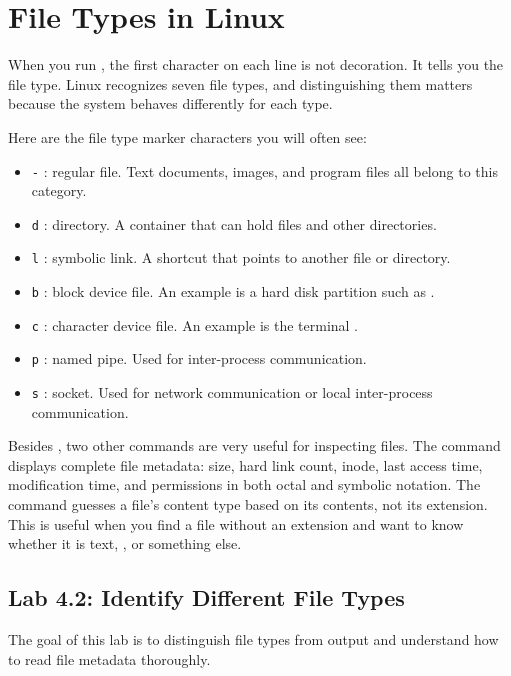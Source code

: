 \section{File Types in Linux}
\label{sec:filetypes}

When you run , the first character on each line is not decoration. It tells you the file type. Linux recognizes seven file types, and distinguishing them matters because the system behaves differently for each type.

Here are the file type marker characters you will often see:

\begin{itemize}
    \item \texttt{-} : regular file. Text documents, images, and program  files all belong to this category.
    \item \texttt{d} : directory. A container that can hold files and other directories.
    \item \texttt{l} : symbolic link. A shortcut that points to another file or directory.
    \item \texttt{b} : block device file. An example is a hard disk partition such as .
    \item \texttt{c} : character device file. An example is the terminal .
    \item \texttt{p} : named pipe. Used for inter-process communication.
    \item \texttt{s} : socket. Used for network communication or local inter-process communication.
\end{itemize}

Besides , two other commands are very useful for inspecting files. The  command displays complete file metadata: size, hard link count, inode, last access time, modification time, and permissions in both octal and symbolic notation. The  command guesses a file's content type based on its contents, not its extension. This is useful when you find a file without an extension and want to know whether it is text, , or something else.

\subsection*{Lab 4.2: Identify Different File Types}

The goal of this lab is to distinguish file types from  output and understand how to read file metadata thoroughly.

